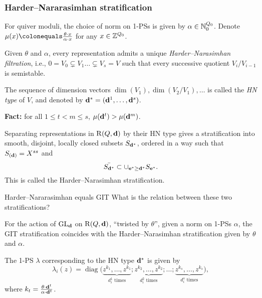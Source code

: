 \documentclass{beamer}
\begin{document}
\begin{frame}
    \frametitle{Harder--Nararasimhan stratification}
    For quiver moduli, the choice of norm on 1-PSs is given by $\alpha \in \mathbb{N}^{Q_0}_0$.
    Denote $\mu(x) \colonequals \frac{\theta \cdot x}{\alpha \cdot x}$ for any $x \in \mathbb{Z}^{Q_0}$. \pause

\begin{definition}
    Given $\theta$ and $\alpha$, every representation admits a unique \emph{Harder--Narasimhan filtration},
    i.e., $ 0 = V_0 \subsetneq V_1 \dots \subsetneq V_s = V$ such that every successive quotient
    $V_i/V_{i-1}$ is semistable.
\end{definition} \pause
The sequence of dimension vectors $\dim(V_1), \dim(V_2/V_1), \dots$ is
called the \emph{HN type} of $V$, and denoted by $\mathbf{d}^* = (\mathbf{d}^1,\dots,\mathbf{d}^s)$. \pause

{\bf Fact: } for all $1 \leq t < m \leq s$, $\mu(\mathbf{d}^{t}) > \mu(\mathbf{d}^m)$.\pause
\begin{theorem}
Separating representations in $\operatorname{R}(Q, \mathbf{d})$ by their HN type gives
a stratification into smooth, disjoint, locally closed subsets $S_{\mathbf{d}^*}$,
ordered in a way such that $S_{(\mathbf{d})} = X^{ss}$ and
\[\bar{S_{\mathbf{d}^*}} \subset \cup_{\mathbf{e}^* \geq \mathbf{d}^*} S_{\mathbf{e}^*}.\] \pause
This is called the Harder--Narasimhan stratification.
\end{theorem}
\end{frame}
\begin{frame}{Harder--Nararasimhan equals GIT}
What is the relation between these two stratifications? \pause
    \begin{theorem}
        For the action of $\operatorname{\operatorname{GL}_{\mathbf{d}}}$ on $\operatorname{R}(Q, \mathbf{d})$,
        ``twisted by $\theta$'', given a norm on 1-PSs $\alpha$,
        the GIT stratification coincides with the Harder--Narasimhan
        stratification given by $\theta$ and $\alpha$.
    \end{theorem}\pause
    
    \begin{corollary}
        The 1-PS $\lambda$ corresponding to the HN type $\mathbf{d}^*$ is given by
        \[ \lambda_i(z) = \operatorname{diag}\big( \underbrace{z^{k_1},\ldots,z^{k_1}}_{d_i^1 \text{ times}}; \underbrace{z^{k_2},\ldots,z^{k_2}}_{d_i^2 \text{ times}};\ldots; \underbrace{z^{k_s},\ldots,z^{k_s}}_{d_i^s \text{ times}} \big),\]
        where $k_t = \frac{\theta \cdot \mathbf{d}^t}{\alpha \cdot \mathbf{d}^t}$.
    \end{corollary}
    
\end{frame}
\end{document}
